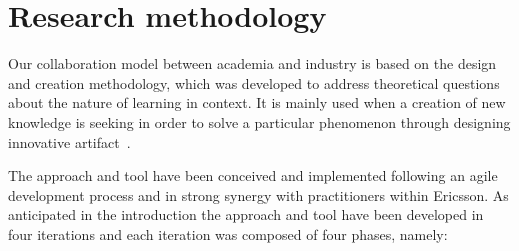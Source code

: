 \section{Research methodology}\label{sec:researchMeth}

Our collaboration model between academia and industry is based on the 
design and creation methodology, which was developed to address theoretical questions about the nature of learning
in context. It is mainly used when a creation of new knowledge is seeking in
order to solve a particular phenomenon through designing innovative artifact~\cite{ResMethod}.

The \approach{} approach and tool have been conceived and implemented following an agile development process %
and in strong synergy with practitioners within Ericsson. 
As anticipated in the introduction the approach and tool have been developed in four iterations and each iteration was composed of four phases, namely: 
